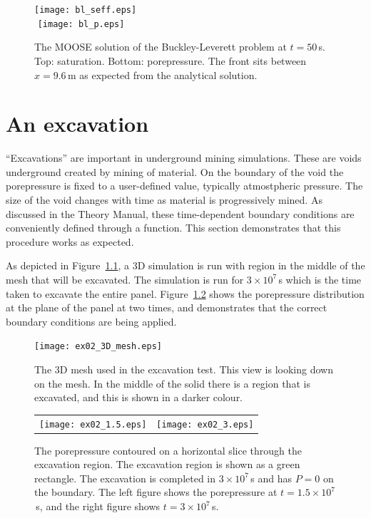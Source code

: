 \documentclass[]{scrreprt}
\begin{document}
\begin{figure}[htb]
\begin{center}
\texttt{[image: bl\_seff.eps]} \\
$\mbox{}$
\texttt{[image: bl\_p.eps]} \\
\caption{The MOOSE solution of the Buckley-Leverett problem at
  $t=50$\,s.  Top: saturation.  Bottom: porepressure.  The front sits
  between $x=9.6$\,m as expected from the analytical solution.}
\label{satfront.figa}
\end{center}
\end{figure}



\chapter{An excavation}
\label{ex}

``Excavations'' are important in underground mining simulations.
These are voids underground created by mining of material.  On the
boundary of the void the porepressure is fixed to a user-defined
value, typically atmostpheric pressure.  The size of the void changes
with time as material is progressively mined.  As discussed in the
Theory Manual, these time-dependent boundary conditions are
conveniently defined through a function.  This section demonstrates
that this procedure works as expected.

As depicted in Figure~\ref{ex02_3D_mesh.fig}, a 3D simulation is run
with region in the middle of the mesh that will be excavated.  The
simulation is run for $3\times 10^{7}$\,s which is the time taken to
excavate the entire panel.  Figure~\ref{ex02.fig} shows the
porepressure distribution at the plane of the panel at two times, and
demonstrates that the correct boundary conditions are being applied.

\begin{figure}[htb]
\centering
\texttt{[image: ex02\_3D\_mesh.eps]}
\caption{The 3D mesh used in the excavation test.  This view is
  looking down on the mesh.  In the middle of
  the solid there is a region that is excavated, and this is shown in
  a darker colour.}
\label{ex02_3D_mesh.fig}
\end{figure}

\begin{figure}[htb]
\centering
\begin{tabular}{cc}
\texttt{[image: ex02\_1.5.eps]} &
\texttt{[image: ex02\_3.eps]}
\end{tabular}
\caption{The porepressure contoured on a horizontal slice through the
  excavation region.  The excavation region is shown as a green
  rectangle.  The excavation is completed in $3\times 10^{7}$\,s and
  has $P=0$ on the boundary.  The left figure shows the porepressure
  at $t=1.5\times 10^{7}$\,s, and the right figure shows $t=3\times
  10^{7}$\,s.}
\label{ex02.fig}
\end{figure}
\end{document}
